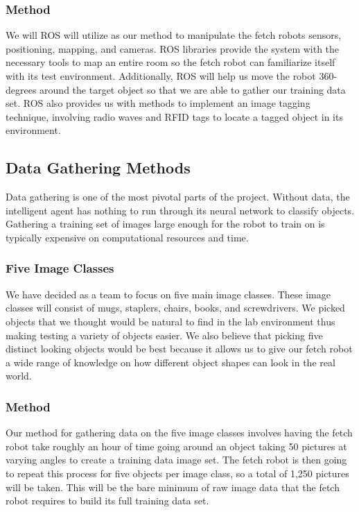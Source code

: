 \documentclass[draftclsnofoot, onecolumn, 10pt, compsoc]{IEEEtran}
\begin{document}
\subsubsection{Method}
We will ROS will utilize as our method to manipulate the fetch robots sensors, positioning, mapping, and cameras. ROS libraries provide the system with the necessary tools to map an entire room so the fetch robot can familiarize itself with its test environment. Additionally, ROS will help us move the robot 360-degrees around the target object so that we are able to gather our training data set. ROS also provides us with methods to implement an image tagging technique, involving radio waves and RFID tags to locate a tagged object in its environment.

\subsection{Data Gathering Methods}
Data gathering is one of the most pivotal parts of the project. Without data, the intelligent agent has nothing to run through its neural network to classify objects. Gathering a training set of images large enough for the robot to train on is typically expensive on computational resources and time.

\subsubsection{Five Image Classes}
We have decided as a team to focus on five main image classes. These image classes will consist of mugs, staplers, chairs, books, and screwdrivers. We picked objects that we thought would be natural to find in the lab environment thus making testing a variety of objects easier. We also believe that picking five distinct looking objects would be best because it allows us to give our fetch robot a wide range of knowledge on how different object shapes can look in the real world. 

\subsubsection{Method}
Our method for gathering data on the five image classes involves having the fetch robot take roughly an hour of time going around an object taking 50 pictures at varying angles to create a training data image set. The fetch robot is then going to repeat this process for five objects per image class, so a total of 1,250 pictures will be taken. This will be the bare minimum of raw image data that the fetch robot requires to build its full training data set.
\end{document}
